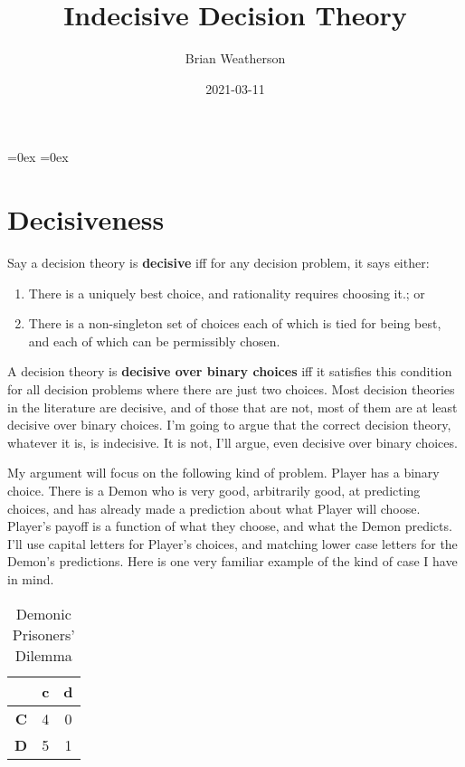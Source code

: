 \documentclass[
  12pt,
]{article}
\title{Indecisive Decision Theory}
\author{Brian Weatherson}
\date{2021-03-11}
\providecommand{\tightlist}{%
  \setlength{\itemsep}{0pt}\setlength{\parskip}{0pt}}
\begin{document}
\maketitle

\setlength\heavyrulewidth{0ex}
\setlength\lightrulewidth{0.08ex}

\aboverulesep=0ex
\belowrulesep=0ex
\renewcommand{\arraystretch}{1.2}
\hypersetup{hidelinks}

\renewcommand\refname{References}

\captionsetup{labelformat=empty, font = small, font = bf, position = below}

\hypertarget{decisiveness}{%
\section{Decisiveness}\label{decisiveness}}

Say a decision theory is \textbf{decisive} iff for any decision problem,
it says either:

\begin{enumerate}
\def\labelenumi{\arabic{enumi}.}
\tightlist
\item
  There is a uniquely best choice, and rationality requires choosing
  it.; or
\item
  There is a non-singleton set of choices each of which is tied for
  being best, and each of which can be permissibly chosen.
\end{enumerate}

A decision theory is \textbf{decisive over binary choices} iff it
satisfies this condition for all decision problems where there are just
two choices. Most decision theories in the literature are decisive, and
of those that are not, most of them are at least decisive over binary
choices. I'm going to argue that the correct decision theory, whatever
it is, is indecisive. It is not, I'll argue, even decisive over binary
choices.

My argument will focus on the following kind of problem. Player has a
binary choice. There is a Demon who is very good, arbitrarily good, at
predicting choices, and has already made a prediction about what Player
will choose. Player's payoff is a function of what they choose, and what
the Demon predicts. I'll use capital letters for Player's choices, and
matching lower case letters for the Demon's predictions. Here is one
very familiar example of the kind of case I have in mind.

\begin{table}[H]

\caption{\label{tab:unnamed-chunk-2}Demonic Prisoners' Dilemma}
\centering
\begin{tabular}[t]{>{}r|cc}

\textbf{} & \textbf{c} & \textbf{d}\\
\midrule
\textbf{C} & 4 & 0\\
\textbf{D} & 5 & 1\\

\end{tabular}
\end{table}
\end{document}
